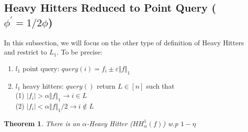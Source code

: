\documentclass[11pt]{article}
\theoremstyle{plain}
\newtheorem{theorem}{Theorem}[section]
\begin{document}
\subsection{Heavy Hitters Reduced to Point Query 
	($\phi^{\prime}=1/2\phi$)}
In this subsection, we will focus on the other type of definition of Heavy Hitters 
and restrict to $L_1$. To be precise:
\begin{enumerate}
	\item $l_1$ point query: $query(i) = f_i\pm \varepsilon\Vert f\Vert_1$
	\item $l_1$ heavy hitters: $query()$ return $L\in [n]$ such that\\
	(1) $|f_i|>\alpha\Vert f\Vert_1\rightarrow i\in L$\\
	(2) $|f_i|<\alpha\Vert f\Vert_1/2\rightarrow i\notin L$
\end{enumerate}

\begin{theorem}
	There is an $\alpha$-Heavy Hitter ($HH_{\alpha}^1(f)$) w.p $1-\eta$
\end{theorem}
\end{document}
